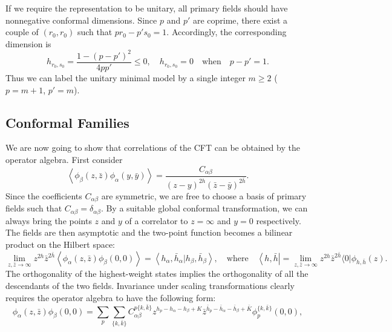 \documentclass[aps,prb,superscriptaddress,nofootinbib]{revtex4}
\begin{document}
If we require the representation to be unitary, all primary fields should have nonnegative conformal dimensions.
Since $p$ and $p'$ are coprime, there exist a couple of $(r_0,r_0)$ such that $p r_0-p' s_0=1$.
Accordingly, the corresponding dimension is 
\begin{equation}
	h_{r_0,s_0} = \frac{1-(p-p')^2}{4pp'} \le 0,\quad
	h_{r_0,s_0} = 0 \quad\text{when}\quad p-p'=1.
\end{equation}
Thus we can label the unitary minimal model by a single integer $m\ge 2$ ($p=m+1$, $p'=m$).


\subsection{Conformal Families}

We are now going to show that correlations of the CFT can be obtained by the operator algebra.
First consider
\begin{equation}
	\left\langle\phi_{\beta}(z,\bar z)\phi_{\alpha}(y,\bar y)\right\rangle=\frac{C_{\alpha \beta}}{(z-y)^{2 h}(\bar{z}-\bar{y})^{2 \bar h}}.
\end{equation}
Since the coefficients $C_{\alpha \beta}$ are symmetric, we are free to choose a basis of primary fields such that $C_{\alpha \beta}=\delta_{\alpha \beta}$. 
By a suitable global conformal transformation, we can always bring the points $z$ and $y$ of a correlator to $z=\infty$ and $y=0$ respectively. 
The fields are then asymptotic and the two-point function becomes a bilinear product on the Hilbert space:
\begin{equation}
	\lim_{z,\bar z \rightarrow \infty} z^{2 h} \bar z^{2\bar h}\left\langle\phi_\alpha(z,\bar z) \phi_\beta(0,0)\right\rangle 
	= \left\langle h_\alpha,\bar{h}_\alpha|h_\beta,\bar{h}_\beta \right\rangle, 
	\quad\text{where}\quad
	\left\langle h,\bar{h}\right| = \lim_{z,\bar z\rightarrow \infty} z^{2h} \bar{z}^{2\bar{h}}\langle 0|\phi_{h,\bar h}(z).
\end{equation}
The orthogonality of the highest-weight states implies the orthogonality of all the descendants of the two fields.
Invariance under scaling transformations clearly requires the operator algebra to have the following form:
\begin{equation}
	\phi_{\alpha}(z, \bar{z}) \phi_{\beta}(0,0) = \sum_{p} \sum_{\{k, \bar{k}\}} C_{\alpha\beta}^{p\{k, \bar{k}\}} z^{h_{p}-h_{\alpha}-h_{\beta}+K} \bar{z}^{\bar{h}_{p}-\bar{h}_{\alpha}-\bar{h}_{\beta}+\bar{K}} 
	\phi^{\{k, \bar{k}\}}_p(0,0),
\end{equation}
\end{document}
